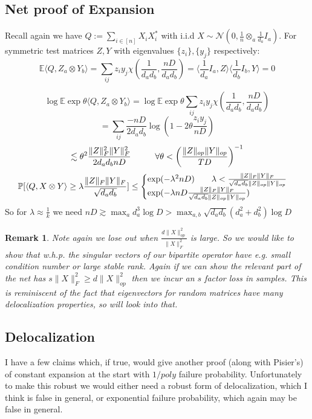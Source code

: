 \documentclass{article}
\newtheorem{remark}{Remark}
\newcommand{\E}{\mathbb{E}}
\renewcommand{\Pr}{\mathbb{P}}
\begin{document}
\subsection{Net proof of Expansion}
Recall again we have $Q := \sum_{i \in [n]} X_{i} X_{i}^{*}$ with i.i.d $X \sim \mathcal{N}(0,\frac{1}{n} \otimes_{a} \frac{1}{d_{a}} I_{a})$. For symmetric test matrices $Z,Y$ with eigenvalues $\{z_{i}\},\{y_{j}\}$ respectively:
\[ \E \langle Q, Z_{a} \otimes Y_{b} \rangle = \sum_{ij} z_{i} y_{j} \chi(\frac{1}{d_{a} d_{b}}, \frac{nD}{d_{a} d_{b}}) = \langle \frac{1}{d_{a}} I_{a}, Z \rangle \langle \frac{1}{d_{b}} I_{b}, Y \rangle = 0 \]

\[ \log \E \exp \theta \langle Q, Z_{a} \otimes Y_{b} \rangle = \log \E \exp \theta \sum_{ij} z_{i} y_{j} \chi(\frac{1}{d_{a} d_{b}}, \frac{nD}{d_{a} d_{b}})  \]
\[ = \sum_{ij} \frac{-nD}{2 d_{a} d_{b}} \log \left( 1 - 2 \theta \frac{z_{i} y_{j}}{nD} \right)   \]
\[ \lesssim \theta^{2} \frac{\|Z\|_{F}^{2} \|Y\|_{F}^{2}}{2 d_{a} d_{b} nD} \hspace{10mm} \forall \theta < \left( \frac{\|Z\|_{op} \|Y\|_{op}}{TD} \right)^{-1}  \]
\[ \Pr[ \langle Q, X \otimes Y \rangle \geq \lambda \frac{\|Z\|_{F} \|Y\|_{F}}{\sqrt{d_{a} d_{b}}} ] \leq 
\begin{cases} 
\exp( - \lambda^{2} nD ) \hspace{7mm} \lambda  < \frac{\|Z\|_{F} \|Y\|_{F}}{\sqrt{d_{a} d_{b}} \|Z\|_{op} \|Y\|_{op}} 
\\ \exp ( - \lambda nD \frac{\|Z\|_{F} \|Y\|_{F}}{ \sqrt{d_{a} d_{b}} \|Z\|_{op} \|Y\|_{op}} )
\end{cases}
\]
So for $\lambda \approx \frac{1}{k}$ we need $nD \gtrsim \max_{a} d_{a}^{3} \log D > \max_{a,b} \sqrt{d_{a} d_{b}} (d_{a}^{2} + d_{b}^{2}) \log D$

\begin{remark}
Note again we lose out when $\frac{d \|X\|_{op}^{2}}{\|X\|_{F}^{2}}$ is large. So we would like to show that w.h.p. the singular vectors of our bipartite operator have e.g. small condition number or large stable rank. Again if we can show the relevant part of the net has $s \|X\|_{F}^{2} \geq d \|X\|_{op}^{2}$ then we incur an $s$ factor loss in samples. This is reminiscent of the fact that eigenvectors for random matrices have many delocalization properties, so will look into that. 
\end{remark}

\subsection{Delocalization}
I have a few claims which, if true, would give another proof (along with Pisier's) of constant expansion at the start with $1/poly$ failure probability. Unfortunately to make this robust we would either need a robust form of delocalization, which I think is false in general, or exponential failure probability, which again may be false in general.
\end{document}
